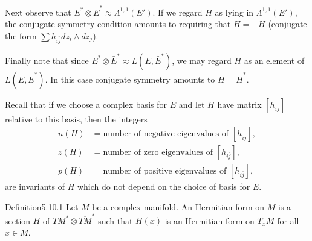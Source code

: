 Next observe that $E^*\otimes\bar E^*\approx\Lambda^{1,1}(E')$. If we regard $H$ as lying in $\Lambda^{1,1}(E')$, the conjugate symmetry condition amounts to requiring that $\bar H=-H$ (conjugate the form $\sum h_{i\bar j}dz_i\wedge d\bar z_j$).

Finally note that since $E^*\otimes\bar E^*\approx L(E,\bar E^*)$, we may regard $H$ as an element of $L(E,\bar E^*)$. In this case conjugate symmetry amounts to $H=\bar H^*$.

Recall that if we choose a complex basis for $E$ and let $H$ have matrix $[h_{i\bar j}]$ relative to this basis, then the integers
\[\begin{split}
n(H)&=\text{number of negative eigenvalues of }[h_{i\bar j}],\\
z(H)&=\text{number of zero eigenvalues of }[h_{i\bar j}],\\
p(H)&=\text{number of positive eigenvalues of }[h_{i\bar j}],
\end{split}\]
are invariants of $H$ which do not depend on the choice of basis for $E$.
\begin{originaltheorem}{Definition}{5.10.1}
Let $M$ be a complex manifold. An Hermitian form on $M$ is a section $H$ of $TM^*\otimes\overline{TM}^*$ such that $H(x)$ is an Hermitian form on $T_xM$ for all $x\in M$.
\end{originaltheorem}
